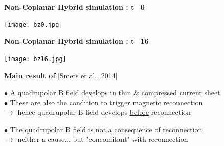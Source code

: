 \documentclass[landscape]{slides}
\begin{document}
\begin{slide}
\large{\textbf{Non-Coplanar Hybrid simulation : t=0}}

\begin{center}
\texttt{[image: bz0.jpg]}
\end{center}

\end{slide}

\begin{slide}
\large{\textbf{Non-Coplanar Hybrid simulation : t=16}}

\begin{center}
\texttt{[image: bz16.jpg]}
\end{center}

\end{slide}

\begin{slide}
\large{\textbf{Main result of} [Smets et al., 2014]}

$\bullet$ A quadrupolar B field develops in thin \& compressed current sheet\\
$\bullet$ These are also the condition to trigger magnetic reconnection\\
$\rightarrow$ hence quadrupolar B field develops \underline{before} reconnection

$\bullet$ The quadrupolar B field is not a consequence of reconnection\\
$\rightarrow$ neither a cause... but "concomitant" with reconnection\\


\end{slide}

\end{document}
